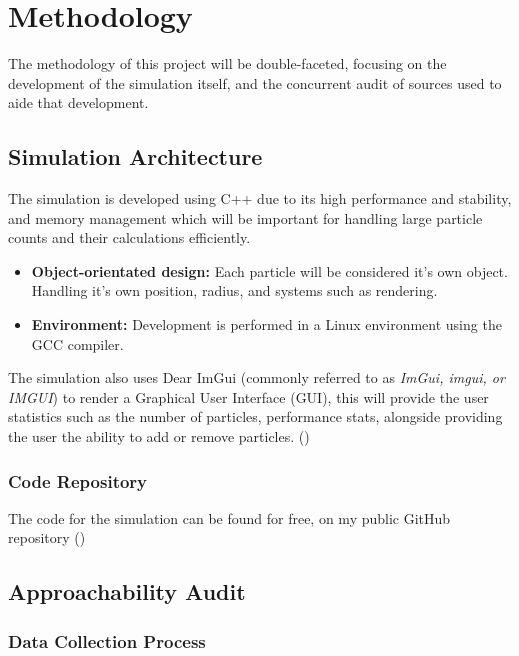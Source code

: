 \chapter{Methodology}

The methodology of this project will be double-faceted, focusing on the development of the simulation itself, and the concurrent audit of
sources used to aide that development.

\section{Simulation Architecture}

The simulation is developed using C++ due to its high performance and stability, and memory management
which will be important for handling large particle counts and their calculations efficiently.

\begin{itemize}
    \item \textbf{Object-orientated design:} Each particle will be considered it's own object. Handling it's own position, radius, and systems such as rendering.
    \item \textbf{Environment:} Development is performed in a Linux environment using the GCC compiler.
\end{itemize}

The simulation also uses Dear ImGui (commonly referred to as \textit{ImGui, imgui, or IMGUI}) to render a Graphical User Interface (GUI), this will provide the user statistics such as the number of particles, performance stats, alongside providing the user the ability to add or remove particles. (\cite{ocornut-imgui})

\subsection{Code Repository}

The code for the simulation can be found for free, on my public GitHub repository (\cite{taylerparsonsUpsilonDiesBackwardsParticlePhysicsSim2026})

\section{Approachability Audit}

\subsection{Data Collection Process}

